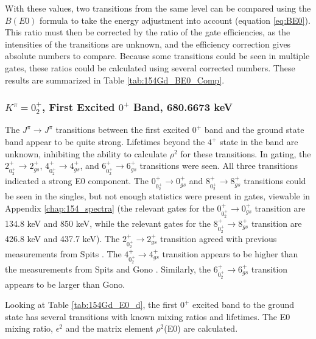 With these values, two transitions from the same level can be compared using the $B(E0)$ formula to take the energy adjustment into account (equation \ref{eq:BE0}). This ratio must then be corrected by the ratio of the gate efficiencies, as the intensities of the transitions are unknown, and the efficiency correction gives absolute numbers to compare. Because some transitions could be seen in multiple gates, these ratios could be calculated using several corrected numbers. These results are summarized in Table \ref{tab:154Gd_BE0_Comp}.

\afterpage{\clearpage}

\afterpage{}

\afterpage{\clearpage}

\afterpage{\clearpage}

\subsubsection{$K^{\pi}=0^+_2$, First Excited $0^+$ Band, 680.6673 keV}

The $J^{\pi}\rightarrow J^{\pi}$ transitions between the first excited $0^+$ band and the ground state band appear to be quite strong. Lifetimes beyond the $4^+$ state in the band are unknown, inhibiting the ability to calculate $\rho^2$ for these transitions. In gating, the $2^+_{0^+_2}\rightarrow 2^+_{gs}$, $4^+_{0^+_2}\rightarrow 4^+_{gs}$, and $6^+_{0^+_2}\rightarrow 6^+_{gs}$ transitions were seen. All three transitions indicated a strong E0 component. The $0^+_{0^+_2}\rightarrow 0^+_{gs}$ and $8^+_{0^+_2}\rightarrow 8^+_{gs}$ transitions could be seen in the singles, but not enough statistics were present in gates, viewable in Appendix \ref{chap:154_spectra} (the relevant gates for the $0^+_{0^+_2}\rightarrow 0^+_{gs}$ transition are 134.8 keV and 850 keV, while the relevant gates for the $8^+_{0^+_2}\rightarrow 8^+_{gs}$ transition are 426.8 keV and 437.7 keV). The $2^+_{0^+_2}\rightarrow 2^+_{gs}$ transition agreed with previous measurements from Spits \citep{spits96:_154gd}. The $4^+_{0^+_2}\rightarrow 4^+_{gs}$ transition appears to be higher than the measurements from Spits and Gono \citep{gono74:_154gd_e0}. Similarly, the $6^+_{0^+_2}\rightarrow 6^+_{gs}$ transition appears to be larger than Gono.

Looking at Table \ref{tab:154Gd_E0_d}, the first $0^+$ excited band to the ground state has several transitions with known mixing ratios and lifetimes. The E0 mixing ratio, $\epsilon^2$ and the matrix element $\rho^2$(E0) are calculated.

